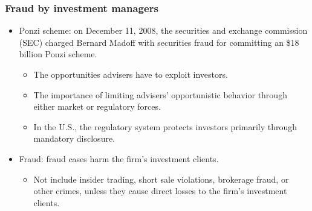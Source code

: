 \subsubsection{Fraud by investment managers}
\begin{itemize}
\item Ponzi scheme: on December 11, 2008, the securities and exchange commission (SEC) charged Bernard Madoff with securities fraud for committing an \$18 billion Ponzi scheme.
    \begin{itemize}
    \item The opportunities advisers have to exploit investors.
    \item The importance of limiting advisers' opportunistic behavior through either market or regulatory forces.
    \item In the U.S., the regulatory system protects investors primarily through mandatory disclosure.
    \end{itemize}
    
\item Fraud: fraud cases harm the firm's investment clients.
    \begin{itemize}
    \item Not include insider trading, short sale violations, brokerage fraud, or other crimes, unless they cause direct losses to the firm's investment clients.
    \end{itemize}
    
\end{itemize}



